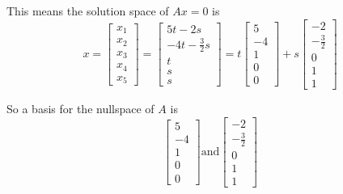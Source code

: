 This means the solution space of $Ax = 0$ is
$$
	x = \begin{bmatrix}x_1\\x_2\\x_3\\x_4\\x_5\end{bmatrix}=\begin{bmatrix}5t - 2s\\-4t - \frac{3}{2}s\\t\\s\\s\end{bmatrix}=t\begin{bmatrix}5\\-4\\1\\0\\0\end{bmatrix}+s\begin{bmatrix}-2\\-\frac{3}{2}\\0\\1\\1\end{bmatrix}
$$

So a basis for the nullspace of $A$ is
$$
	\begin{bmatrix}5\\-4\\1\\0\\0\end{bmatrix} \text{and} \begin{bmatrix}-2\\-\frac{3}{2}\\0\\1\\1\end{bmatrix}
$$
